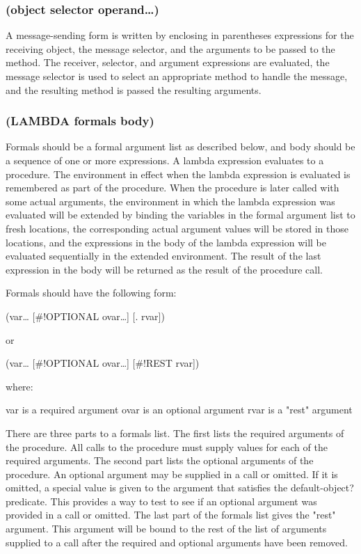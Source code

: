 \documentclass[11pt]{article}
\begin{document}
\subsubsection{(object selector operand\ldots{})}
\label{sec-4-3-6}

A message-sending form is written by enclosing in parentheses
expressions for the receiving object, the message selector, and the
arguments to be passed to the method.  The receiver, selector, and
argument expressions are evaluated, the message selector is used to
select an appropriate method to handle the message, and the resulting
method is passed the resulting arguments.
\subsubsection{(LAMBDA formals body)}
\label{sec-4-3-7}

Formals should be a formal argument list as described below, and body
should be a sequence of one or more expressions.  A lambda expression
evaluates to a procedure.  The environment in effect when the lambda
expression is evaluated is remembered as part of the procedure.  When
the procedure is later called with some actual arguments, the
environment in which the lambda expression was evaluated will be
extended by binding the variables in the formal argument list to
fresh locations, the corresponding actual argument values will be
stored in those locations, and the expressions in the body of the
lambda expression will be evaluated sequentially in the extended
environment.  The result of the last expression in the body will be
returned as the result of the procedure call.

Formals should have the following form:

(var\ldots{} [\#!OPTIONAL ovar\ldots{}] [. rvar])

or

(var\ldots{} [\#!OPTIONAL ovar\ldots{}] [\#!REST rvar])

where:

var is a required argument
ovar is an optional argument
rvar is a "rest" argument

There are three parts to a formals list.  The first lists the
required arguments of the procedure.  All calls to the procedure must
supply values for each of the required arguments.  The second part
lists the optional arguments of the procedure.  An optional argument
may be supplied in a call or omitted.  If it is omitted, a special
value is given to the argument that satisfies the default-object?
predicate.  This provides a way to test to see if an optional
argument was provided in a call or omitted.  The last part of the
formals list gives the "rest" argument.  This argument will be bound
to the rest of the list of arguments supplied to a call after the
required and optional arguments have been removed.
\end{document}

